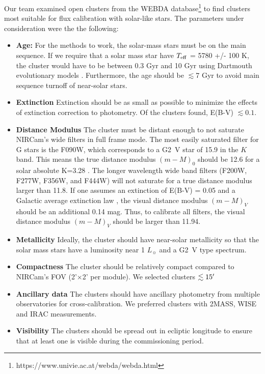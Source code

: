 \documentclass{aastex6}
\begin{document}
Our team examined open clusters from the WEBDA database\footnote{https://www.univie.ac.at/webda/webda.html} to find clusters most suitable for flux calibration with solar-like stars.
The parameters under consideration were the the following:
\begin{itemize}
\item {\bf Age:} For the methods to work, the solar-mass stars must be on the main sequence. If we require that a solar mass star have $T_{\rm eff}$ = 5780 +/- 100 K, the cluster would have to be between 0.3 Gyr and 10 Gyr using Dartmouth evolutionary models \citep{dotter2008dartmouth}. Furthermore, the age should be $\lesssim$7 Gyr to avoid main sequence turnoff of near-solar stars.
\item {\bf Extinction} Extinction should be as small as possible to minimize the effects of extinction correction to photometry. Of the clusters found, E(B-V) $\lesssim 0.1$.
\item {\bf Distance Modulus} The cluster must be distant enough to not saturate NIRCam's wide filters in full frame mode. The most easily saturated filter for G stars is the F090W, which corresponds to a G2~V star of 15.9 in the $K$ band. This means the true distance modulus $(m - M)_0$ should be 12.6 for a solar absolute K=3.28 \citep{binney1998book}.
The longer wavelength wide band filters (F200W, F277W, F356W, and F444W) will not saturate for a true distance modulus larger than 11.8.
If one assumes an extinction of E(B-V) = 0.05 and a Galactic average extinction law \citep{cardelli1989}, the visual distance modulus $(m- M)_V$ should be an additional 0.14 mag.
Thus, to calibrate all filters, the visual distance modulus $(m- M)_V$ should be larger than 11.94.
\item {\bf Metallicity} Ideally, the cluster should have near-solar metallicity so that the solar mass stars have a luminosity near 1 $L_\sun$ and a G2~V type spectrum.
\item {\bf Compactness} The cluster should be relatively compact compared to NIRCam's FOV (2'$\times$2' per module). We selected clusters $\lesssim 15\mbox{$^\prime$}$
\item {\bf Ancillary data} The clusters should have ancillary photometry from multiple observatories for cross-calibration. We preferred clusters with 2MASS, WISE and IRAC measurements.
\item {\bf Visibility} The clusters should be spread out in ecliptic longitude to ensure that at least one is visible during the commissioning period.
\end{itemize}
\end{document}
